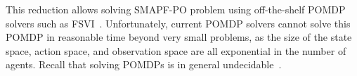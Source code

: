 \documentclass[letterpaper]{article} %
\newcommand{\plan}[1]{{\textcolor{blue}{[Plan: #1]}}}
\newcommand{\inon}[1]{ }
\newcommand{\roni}[1]{ }
\begin{document}
This reduction allows solving SMAPF-PO problem using off-the-shelf POMDP solvers such as FSVI~\cite{shani2007forward}. 
Unfortunately, current POMDP solvers cannot solve this POMDP in reasonable time beyond very small problems, as the size of the state space, action space, and observation space are all exponential in the number of agents. Recall that solving POMDPs is in general undecidable~\cite{madani2003undecidability}. %








\end{document}
